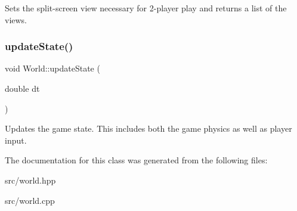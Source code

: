 Sets the split-\/screen view necessary for 2-\/player play and returns a list of the views. \hypertarget{classWorld_aea52953b00dfbea7766176454206b007}{}\label{classWorld_aea52953b00dfbea7766176454206b007} 
\subsubsection{\texorpdfstring{update\+State()}{updateState()}}
{\footnotesize\ttfamily void World\+::update\+State (\begin{DoxyParamCaption}\item[{double}]{dt }\end{DoxyParamCaption})}

Updates the game state. This includes both the game physics as well as player input. 

The documentation for this class was generated from the following files\+:\begin{DoxyCompactItemize}
\item 
src/world.\+hpp\item 
src/world.\+cpp\end{DoxyCompactItemize}
